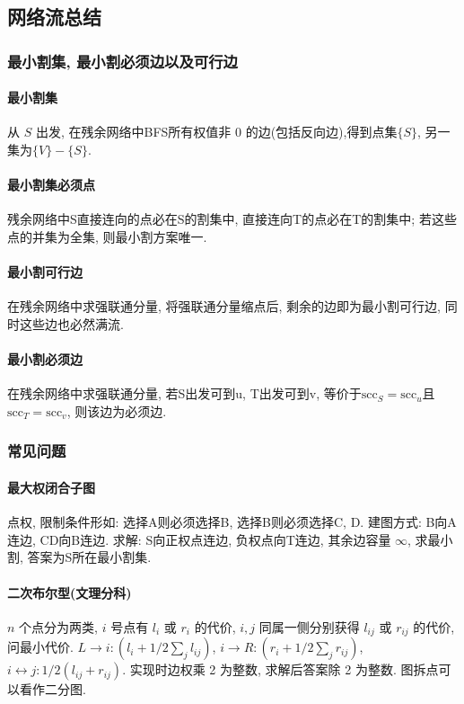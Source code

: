 \subsection{网络流总结}

\subsubsection*{最小割集, 最小割必须边以及可行边}

\paragraph{最小割集} 从 $S$ 出发, 在残余网络中BFS所有权值非 $0$ 的边(包括反向边),得到点集$\{S\}$, 另一集为$\{V\} - \{S\}$. 
\paragraph{最小割集必须点} 残余网络中S直接连向的点必在S的割集中, 直接连向T的点必在T的割集中; 若这些点的并集为全集, 则最小割方案唯一.
\paragraph{最小割可行边} 在残余网络中求强联通分量, 将强联通分量缩点后, 剩余的边即为最小割可行边, 同时这些边也必然满流.
\paragraph{最小割必须边} 在残余网络中求强联通分量, 若S出发可到u, T出发可到v, 等价于$\mathrm{scc}_S=\mathrm{scc}_u$且$\mathrm{scc}_T = \mathrm{scc}_v$, 则该边为必须边.

\subsubsection*{常见问题}

\paragraph{最大权闭合子图}
点权, 限制条件形如: 选择A则必须选择B, 选择B则必须选择C, D. 建图方式: B向A连边, CD向B连边.
求解: S向正权点连边, 负权点向T连边, 其余边容量 $\infty$, 求最小割, 答案为S所在最小割集.
\paragraph{二次布尔型(文理分科)}
$n$ 个点分为两类, $i$ 号点有 $l_{i}$ 或 $r_{i}$ 的代价, $i, j$ 同属一侧分别获得 $l_{ij}$ 或 $r_{ij}$ 的代价, 问最小代价.
$L\rightarrow i: (l_i + 1/2 \sum_{j} l_{ij})$, $i \rightarrow R: (r_i + 1/2 \sum_{j} r_{ij})$,
$i \leftrightarrow j: 1/2 (l_{ij} + r_{ij})$. 实现时边权乘 2 为整数, 求解后答案除 2 为整数. 图拆点可以看作二分图.

